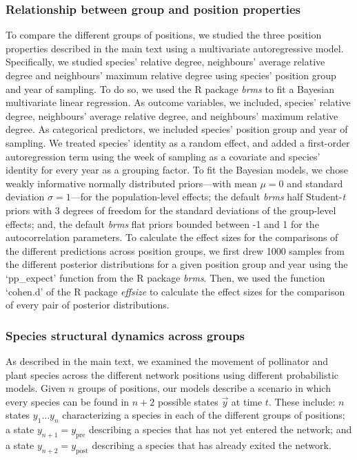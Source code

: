 \documentclass[11pt, a4paper]{article}
\begin{document}
\subsubsection*{Relationship between group and position properties}
To compare the different groups of positions, we studied the three position properties described in the main text using a multivariate autoregressive model. Specifically, we studied species' relative degree, neighbours' average relative degree and neighbours' maximum relative degree using species' position group and year of sampling. To do so, we used the R package \textit{brms}\cite{burkner2017brms} to fit a Bayesian multivariate linear regression. As outcome variables, we included, species' relative degree, neighbours' average relative degree, and neighbours' maximum relative degree. As categorical predictors, we included species' position group and year of sampling. We treated species' identity as a random effect, and added a first-order autoregression term using the week of sampling as a covariate and species' identity for every year as a grouping factor. To fit the Bayesian models, we chose weakly informative normally distributed priors---with mean $\mu=0$ and standard deviation $\sigma=1$---for the population-level effects; the default \textit{brms} half Student-\textit{t} priors with 3 degrees of freedom for the standard deviations of the group-level effects; and, the default \textit{brms} flat priors bounded between -1 and 1 for the autocorrelation parameters. To calculate the effect sizes for the comparisons of the different predictions across position groups, we first drew 1000 samples from the different posterior distributions for a given position group and year using the `pp\_expect' function from the R package \textit{brms}\cite{burkner2017brms}. Then, we used the function `cohen.d' of the R package \textit{effsize}\cite{torchiano2017effsize} to calculate the effect sizes for the comparison of every pair of posterior distributions.

\subsubsection*{Species structural dynamics across groups}
As described in the main text, we examined the movement of pollinator and plant species across the different network positions using different probabilistic models. Given $n$ groups of positions, our models describe a scenario in which every species can be found in $n+2$ possible states $\vec{y}$ at time $t$. These include: $n$ states $y_1\dots y_n$ characterizing a species in each of the different groups of positions; a state $y_{n+1}=y_{\text{pre}}$ describing a species that has not yet entered the network; and a state $y_{n+2}=y_{\text{post}}$ describing a species that has already exited the network.
\end{document}
